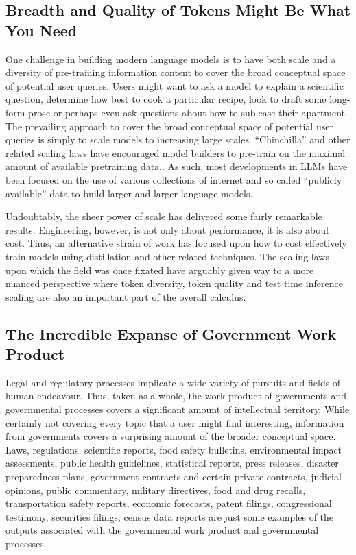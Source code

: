 \subsection{Breadth and Quality of Tokens Might Be What You Need}
One challenge in building modern language models is to have both scale and a diversity of pre-training information content to cover the broad conceptual space of potential user queries.  Users might want to ask a model to explain a scientific question, determine how best to cook a particular recipe, look to draft some long-form prose or perhaps even ask questions about how to sublease their apartment.  The prevailing approach to cover the broad conceptual space of potential user queries is simply to scale models to increasing large scales.\cite{kaplan2020scaling}  ``Chinchilla'' and other related scaling laws have encouraged model builders to pre-train on the maximal amount of available pretraining data.\cite{hoffmann2022training}\cite{pearce2024reconciling}.  As such, most developments in LLMs have been focused on the use of various collections of internet and so called ``publicly available'' data to build larger and larger language models. 

Undoubtably, the sheer power of scale has delivered some fairly remarkable results. Engineering, however, is not only about performance, it is also about cost.\cite{Krishna2025}  Thus, an alternative strain of work has focused upon how to cost effectively train models using distillation and other related techniques.\cite{guo2025deepseek}\cite{zhang2024tinyllama}\cite{javaheripi2023phi} The scaling laws upon which the field was once fixated have arguably given way to a more nuanced perspective where token diversity, token quality and test time inference scaling are also an important part of the overall calculus.\cite{snell2024scaling}\cite{yu2024makes}  

\subsection{The Incredible Expanse of Government Work Product}
Legal and regulatory processes implicate a wide variety of pursuits and fields of human endeavour.  Thus, taken as a whole, the work product of governments and governmental processes covers a significant amount of intellectual territory.  While certainly not covering every topic that a user might find interesting, information from governments covers a surprising amount of the broader conceptual space.  Laws, regulations, scientific reports, food safety bulletins, environmental impact assessments, public health guidelines, statistical reports, press releases, disaster preparedness plans, government contracts and certain private contracts, judicial opinions, public commentary, military directives, food and drug recalls, transportation safety reports, economic forecasts, patent filings, congressional testimony, securities filings, census data reports are just some examples of the outputs associated with the governmental work product and governmental processes.  

